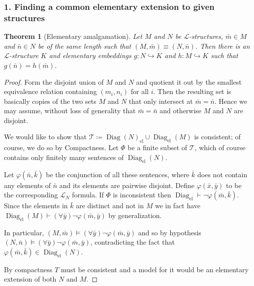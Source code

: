\documentclass{report}
\DeclareMathOperator{\Diag}{Diag}
\theoremstyle{definition}
\theoremstyle{plain}
\newtheorem{thm}{Theorem}[section]
\theoremstyle{definition}
\begin{document}
 		\subsubsection*{1. Finding a common elementary extension to given structures}
 		\begin{thm}[Elementary amalgamation]
 			Let $M$ and $N$ be $\mathcal{L}$-structures, $\bar{m}\in M$ and $\bar{n}\in N$ be of the same length such that $(M, \bar{m}) \equiv (N, \bar{n})$.  Then there is an $\mathcal{L}$-structure $K$ and elementary embeddings $g\colon N \hookrightarrow K$ and $h\colon M \hookrightarrow K$ such that $g(\bar{n}) = h(\bar{m})$.
 		\end{thm}
 		\begin{proof}
 			Form the disjoint union of $M$ and $N$ and quotient it out by the smallest equivalence relation containing $(m_i,n_i)$ for all $i$. Then the resulting set is basically copies of the two sets $M$ and $N$ that only intersect at $\bar{m} = \bar{n}$. Hence we may assume, without loss of generality that $\bar{m} = \bar{n}$ and otherwise $M$ and $N$ are disjoint.
 			
 			We would like to show that $\mathcal{T}\coloneqq \Diag(N)_{\text{el}} \cup \Diag_{\text{el}}(M)$ is consistent; of course, we do so by Compactness. Let $\Phi$ be a finite subset of $\mathcal{T}$, which of course contains only finitely many sentences of $\Diag_{\text{el}}(N)$.
 			
 			Let $\varphi(\bar{n},\bar{k})$ be the conjunction of all these sentences, where $\bar{k}$ does not contain any elements of $\bar{n}$ and its elements are pairwise disjoint. Define $\varphi(\bar{x},\bar{y})$ to be the corresponding $\mathcal{L}_N$ formula. If $\Phi$ is inconsistent then $\Diag_{\text{el}} \vdash \neg \varphi(\bar{m},\bar{k})$. Since the elements in $\bar{k}$  are distinct and not in $M$ we in fact have $\Diag_{\text{el}}(M)\vdash (\forall \bar{y}) \neg \varphi(\bar{m},\bar{y})$ by generalization.
 			
 			In particular, $(M,\bar{m})\models (\forall \bar{y}) \neg \varphi(\bar{m},\bar{y})$ and so by hypothesis  $(N,\bar{n})\models (\forall \bar{y}) \neg \varphi(\bar{m},\bar{y})$, contradicting the fact that $\varphi(\bar{m},\bar{k})\in \Diag_{\text{el}}(N)$.
 			
 			By compactness $T$ must be consistent and a model for it would be an elementary extension of both $N$ and $M$.
 		\end{proof}
\end{document}
